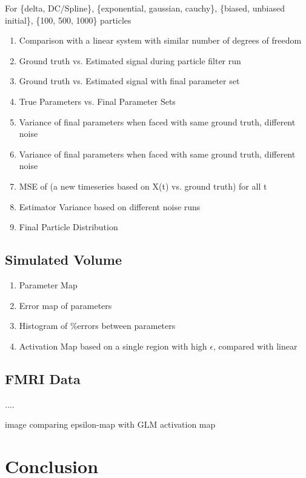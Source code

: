 \documentclass{article}
\begin{document}
For \{delta, DC/Spline\}, \{exponential, gaussian, cauchy\}, \{biased, unbiased initial\},
\{100, 500, 1000\} particles
\begin{enumerate}
\item Comparison with a linear system with similar number of degrees of freedom
\item Ground truth vs. Estimated signal during particle filter run
\item Ground truth vs. Estimated signal with final parameter set
\item True Parameters vs. Final Parameter Sets
\item Variance of final parameters when faced with same ground truth, different noise
\item Variance of final parameters when faced with same ground truth, different noise
\item MSE of (a new timeseries based on X(t) vs. ground truth) for all t
\item Estimator Variance based on different noise runs
\item Final Particle Distribution
\end{enumerate}

\subsection{Simulated Volume}
\begin{enumerate}
\item Parameter Map 
\item Error map of parameters
\item Histogram of \%errors between parameters
\item Activation Map based on a single region with high $\epsilon$, compared with linear
\end{enumerate}

\subsection{FMRI Data}
....

image comparing epsilon-map with GLM activation map

\section{Conclusion}



\end{document}
